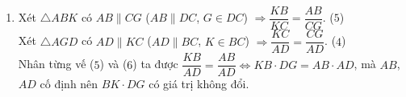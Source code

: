 \begin{bt}
{\begin{enumerate}
			Từ ($ 3 $) và ($ 4 $) ta được $ \dfrac{AE}{AK}+\dfrac{AE}{AG}= \dfrac{DE}{DB}+\dfrac{BE}{BD}=\dfrac{BD}{BD}=1$.
			\item Xét $ \triangle ABK $ có $ AB \parallel CG $ ($ AB \parallel DC $, $ G \in DC $) $ \Rightarrow \dfrac{KB}{KC}=\dfrac{AB}{CG} $. \hfill($ 5 $)\\
			Xét $ \triangle AGD $ có $ AD \parallel KC $ ($ AD \parallel BC $, $ K \in BC $) $ \Rightarrow \dfrac{KC}{AD}=\dfrac{CG}{AD} $. \hfill($ 4 $)\\
			Nhân từng vế ($ 5 $) và ($ 6 $) ta được $ \dfrac{KB}{AD}=\dfrac{AB}{AD} \Leftrightarrow KB \cdot DG=AB \cdot AD$, mà $ AB $, $ AD $ cố định nên $ BK \cdot DG $ có giá trị không đổi.
		\end{enumerate}
		
	}
\end{bt}
